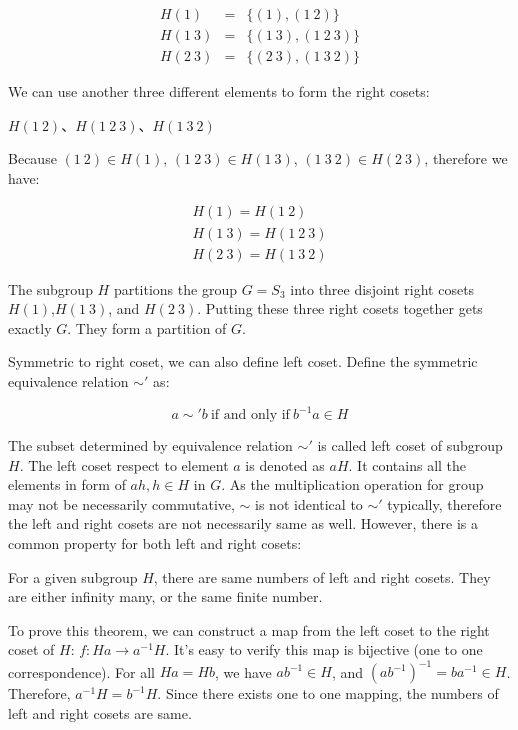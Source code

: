 \documentclass{article}
\begin{document}
\[
\begin{array}{rcl}
H(1) & = & \{(1), (1\ 2)\} \\
H(1\ 3) & = & \{(1\ 3), (1\ 2\ 3)\} \\
H(2\ 3) & = & \{(2\ 3), (1\ 3\ 2)\}
\end{array}
\]

We can use another three different elements to form the right cosets:

$H(1\ 2)$、$H(1\ 2\ 3)$、$H(1\ 3\ 2)$

Because $(1\ 2) \in H(1)$, $(1\ 2\ 3) \in H(1\ 3)$, $(1\ 3\ 2) \in H(2\ 3)$, therefore we have:

\[
\begin{array}{l}
H(1) = H(1\ 2) \\
H(1\ 3) = H(1\ 2\ 3) \\
H(2\ 3) = H(1\ 3\ 2)
\end{array}
\]

The subgroup $H$ partitions the group $G = S_3$ into three disjoint right cosets $H(1)$,$H(1\ 3)$, and $H(2\ 3)$. Putting these three right cosets together gets exactly $G$. They form a partition of $G$.

Symmetric to right coset, we can also define left coset. Define the symmetric equivalence relation $\sim'$ as:

\[
a \sim' b\ \text{if and only if}\ b^{-1}a \in H
\]

The subset determined by equivalence relation $\sim'$ is called left coset of subgroup $H$. The left coset respect to element $a$ is denoted as $aH$. It contains all the elements in form of $ah, h \in H$ in $G$. As the multiplication operation for group may not be necessarily commutative, $\sim$ is not identical to $\sim'$ typically, therefore the left and right cosets are not necessarily same as well. However, there is a common property for both left and right cosets:

\begin{theorem}
For a given subgroup $H$, there are same numbers of left and right cosets. They are either infinity many, or the same finite number.
\end{theorem}

To prove this theorem, we can construct a map from the left coset to the right coset of $H$: $f: Ha \to a^{-1}H$. It's easy to verify this map is bijective (one to one correspondence). For all $Ha = Hb$, we have $ab^{-1} \in H$, and $(ab^{-1})^{-1} = ba^{-1} \in H$. Therefore, $a^{-1}H= b^{-1}H$. Since there exists one to one mapping, the numbers of left and right cosets are same.
\end{document}
